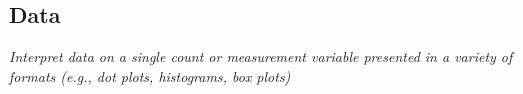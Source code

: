 \subsection[data]{Data}


\textit{Interpret data on a single count or measurement variable presented in a variety of formats (e.g., dot plots, histograms, box plots)
}